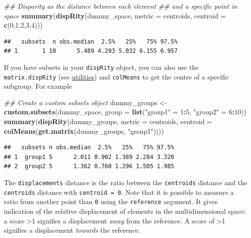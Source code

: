 \documentclass[
]{book}
\newenvironment{Shaded}{\begin{snugshade}}{\end{snugshade}}
\newcommand{\CommentTok}[1]{\textcolor[rgb]{0.56,0.35,0.01}{\textit{#1}}}
\newcommand{\DataTypeTok}[1]{\textcolor[rgb]{0.13,0.29,0.53}{#1}}
\newcommand{\DecValTok}[1]{\textcolor[rgb]{0.00,0.00,0.81}{#1}}
\newcommand{\KeywordTok}[1]{\textcolor[rgb]{0.13,0.29,0.53}{\textbf{#1}}}
\newcommand{\NormalTok}[1]{#1}
\newcommand{\OperatorTok}[1]{\textcolor[rgb]{0.81,0.36,0.00}{\textbf{#1}}}
\newcommand{\StringTok}[1]{\textcolor[rgb]{0.31,0.60,0.02}{#1}}
\begin{document}
\begin{Shaded}
\begin{Highlighting}[]
\CommentTok{\#\# Disparity as the distance between each element}
\CommentTok{\#\# and a specific point in space}
\KeywordTok{summary}\NormalTok{(}\KeywordTok{dispRity}\NormalTok{(dummy\_space, }\DataTypeTok{metric =}\NormalTok{ centroids,}
                 \DataTypeTok{centroid =} \KeywordTok{c}\NormalTok{(}\DecValTok{0}\NormalTok{,}\DecValTok{1}\NormalTok{,}\DecValTok{2}\NormalTok{,}\DecValTok{3}\NormalTok{,}\DecValTok{4}\NormalTok{)))}
\end{Highlighting}
\end{Shaded}

\begin{verbatim}
##   subsets  n obs.median  2.5%   25%   75% 97.5%
## 1       1 10      5.489 4.293 5.032 6.155 6.957
\end{verbatim}

If you have subsets in your \texttt{dispRity} object, you can also use the \texttt{matrix.dispRity} (see \protect\hyperlink{utilities}{utilities}) and \texttt{colMeans} to get the centre of a specific subgroup.
For example

\begin{Shaded}
\begin{Highlighting}[]
\CommentTok{\#\# Create a custom subsets object}
\NormalTok{dummy\_groups \textless{}{-}}\StringTok{ }\KeywordTok{custom.subsets}\NormalTok{(dummy\_space,}
                               \DataTypeTok{group =} \KeywordTok{list}\NormalTok{(}\StringTok{"group1"}\NormalTok{ =}\StringTok{ }\DecValTok{1}\OperatorTok{:}\DecValTok{5}\NormalTok{,}
                                            \StringTok{"group2"}\NormalTok{ =}\StringTok{ }\DecValTok{6}\OperatorTok{:}\DecValTok{10}\NormalTok{))}
\KeywordTok{summary}\NormalTok{(}\KeywordTok{dispRity}\NormalTok{(dummy\_groups, }\DataTypeTok{metric =}\NormalTok{ centroids,}
    \DataTypeTok{centroid =} \KeywordTok{colMeans}\NormalTok{(}\KeywordTok{get.matrix}\NormalTok{(dummy\_groups, }\StringTok{"group1"}\NormalTok{))))}
\end{Highlighting}
\end{Shaded}

\begin{verbatim}
##   subsets n obs.median  2.5%   25%   75% 97.5%
## 1  group1 5      2.011 0.902 1.389 2.284 3.320
## 2  group2 5      1.362 0.760 1.296 1.505 1.985
\end{verbatim}

The \texttt{displacements} distance is the ratio between the \texttt{centroids} distance and the \texttt{centroids} distance with \texttt{centroid\ =\ 0}.
Note that it is possible to measure a ratio from another point than \texttt{0} using the \texttt{reference} argument.
It gives indication of the relative displacement of elements in the multidimensional space: a score \textgreater1 signifies a displacement \emph{away} from the reference. A score of \textgreater1 signifies a displacement \emph{towards} the reference.
\end{document}
